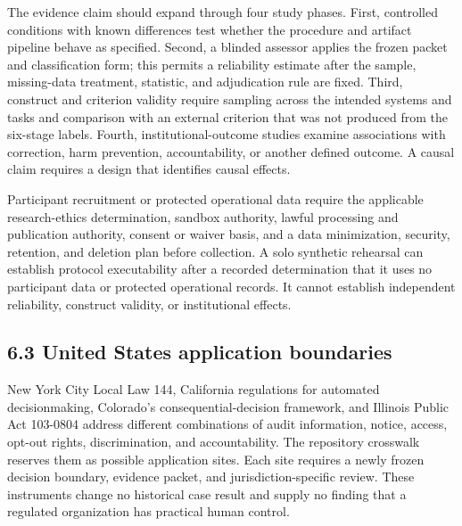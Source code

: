 \documentclass[11pt]{article}
\begin{document}
The evidence claim should expand through four study phases. First, controlled conditions with known differences test whether the procedure and artifact pipeline behave as specified. Second, a blinded assessor applies the frozen packet and classification form; this permits a reliability estimate after the sample, missing-data treatment, statistic, and adjudication rule are fixed. Third, construct and criterion validity require sampling across the intended systems and tasks and comparison with an external criterion that was not produced from the six-stage labels. Fourth, institutional-outcome studies examine associations with correction, harm prevention, accountability, or another defined outcome. A causal claim requires a design that identifies causal effects.

Participant recruitment or protected operational data require the applicable research-ethics determination, sandbox authority, lawful processing and publication authority, consent or waiver basis, and a data minimization, security, retention, and deletion plan before collection. A solo synthetic rehearsal can establish protocol executability after a recorded determination that it uses no participant data or protected operational records. It cannot establish independent reliability, construct validity, or institutional effects.

\subsection*{6.3 United States application boundaries}
New York City Local Law 144, California regulations for automated decisionmaking, Colorado's consequential-decision framework, and Illinois Public Act 103-0804 address different combinations of audit information, notice, access, opt-out rights, discrimination, and accountability. The repository crosswalk reserves them as possible application sites. Each site requires a newly frozen decision boundary, evidence packet, and jurisdiction-specific review. These instruments change no historical case result and supply no finding that a regulated organization has practical human control.
\FloatBarrier
\end{document}
